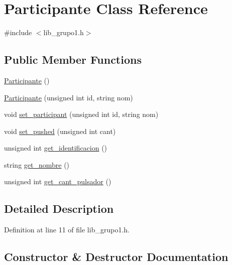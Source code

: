 \hypertarget{classParticipante}{}\section{Participante Class Reference}
\label{classParticipante}


{\ttfamily \#include $<$lib\+\_\+grupo1.\+h$>$}

\subsection*{Public Member Functions}
\begin{DoxyCompactItemize}
\item 
\hyperlink{classParticipante_a24ab9aed90b8957e5c8cb663ab49f78d}{Participante} ()
\item 
\hyperlink{classParticipante_ac84681fe84456274ce473271e7f7c142}{Participante} (unsigned int id, string nom)
\item 
void \hyperlink{classParticipante_a35e316f68e68fad881634be797a29000}{set\+\_\+participant} (unsigned int id, string nom)
\item 
void \hyperlink{classParticipante_a1a0ce183171c0b6b3ec8f0aab3ed9b75}{set\+\_\+pushed} (unsigned int cant)
\item 
unsigned int \hyperlink{classParticipante_ab39d927b0395b10236db2e68dbc21591}{get\+\_\+identificacion} ()
\item 
string \hyperlink{classParticipante_a693b2864e7d79fb64765b678f92d64e9}{get\+\_\+nombre} ()
\item 
unsigned int \hyperlink{classParticipante_ac466291837016af5a0fc0cf0d0fbaf00}{get\+\_\+cant\+\_\+pulsador} ()
\end{DoxyCompactItemize}


\subsection{Detailed Description}


Definition at line 11 of file lib\+\_\+grupo1.\+h.



\subsection{Constructor \& Destructor Documentation}
\mbox{\label{classParticipante_a24ab9aed90b8957e5c8cb663ab49f78d}} 
